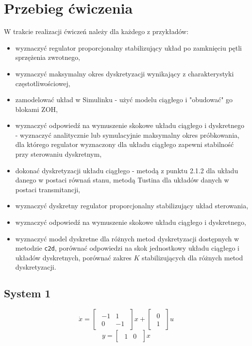 \documentclass{article}
\begin{document}
\section{Przebieg ćwiczenia}
W trakcie realizacji ćwiczeń należy dla każdego z przykładów:
\begin{itemize}
    \item wyznaczyć regulator proporcjonalny stabilizujący układ po zamknięciu pętli sprzężenia zwrotnego,
    \item wyznaczyć maksymalny okres dyskretyzacji wynikający z charakterystyki częstotliwościowej,
    \item zamodelować układ w Simulinku - użyć modelu ciągłego i "obudować" go blokami ZOH,
    \item wyznaczyć odpowiedź na wymuszenie skokowe układu ciągłego i dyskretnego - wyznaczyć analitycznie lub symulacyjnie maksymalny okres próbkowania, dla którego regulator wyznaczony dla układu ciągłego zapewni stabilność przy sterowaniu dyskretnym,
    \item dokonać dyskretyzacji układu ciągłego - metodą z punktu 2.1.2 dla układu danego w postaci równań stanu, metodą Tustina dla układów danych w postaci transmitancji,
    \item wyznaczyć dyskretny regulator proporcjonalny stabilizujący układ sterowania,
    \item wyznaczyć odpowiedź na wymuszenie skokowe układu ciągłego i dyskretnego,
    \item wyznaczyć model dyskretne dla różnych metod dyskretyzacji dostępnych w metodzie \texttt{c2d}, porównać odpowiedzi na skok jednostkowy układu ciągłego i układów dyskretnych, porównać zakres $K$ stabilizujących dla różnych metod dyskretyzacji.
\end{itemize}
    \subsection{System 1}
    $$
        \dot{x}
        =
        \begin{bmatrix}
        \begin{array}{rr}
            -1 & 1\\
            0 & -1
        \end{array}                
        \end{bmatrix}
        x
        +
        \begin{bmatrix}
        \begin{array}{c}
            0\\
            1
        \end{array}                
        \end{bmatrix}
        u
    $$
    $$
        y
        =
        \begin{bmatrix}
        \begin{array}{cc}
            1 & 0
        \end{array}                
        \end{bmatrix}
        x
    $$
\end{document}
